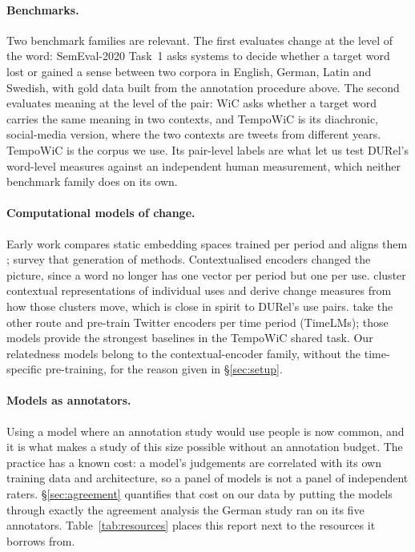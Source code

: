 \documentclass{article}
\begin{document}
\paragraph{Benchmarks.} Two benchmark families are relevant. The first evaluates
change at the level of the word: SemEval-2020 Task~1
\citep{schlechtweg2020semeval} asks systems to decide whether a target word lost
or gained a sense between two corpora in English, German, Latin and Swedish, with
gold data built from the annotation procedure above. The second evaluates
meaning at the level of the pair: WiC \citep{pilehvar2019wic} asks whether a
target word carries the same meaning in two contexts, and TempoWiC
\citep{loureiro2022tempowic} is its diachronic, social-media version, where the
two contexts are tweets from different years. TempoWiC is the corpus we use.
Its pair-level labels are what let us test DURel's word-level measures against
an independent human measurement, which neither benchmark family does on its
own.

\paragraph{Computational models of change.} Early work compares static
embedding spaces trained per period and aligns them
\citep{hamilton2016cultural}; \citet{kutuzov2018survey} survey that generation of
methods. Contextualised encoders changed the picture, since a word no longer has
one vector per period but one per use. \citet{giulianelli2020analysing} cluster
contextual representations of individual uses and derive change measures from
how those clusters move, which is close in spirit to DURel's use pairs.
\citet{loureiro2022timelms} take the other route and pre-train Twitter encoders
per time period (TimeLMs); those models provide the strongest baselines in the
TempoWiC shared task. Our relatedness models belong to the contextual-encoder
family, without the time-specific pre-training, for the reason given in
\S\ref{sec:setup}.

\paragraph{Models as annotators.} Using a model where an annotation study would
use people is now common, and it is what makes a study of this size possible
without an annotation budget. The practice has a known cost: a model's
judgements are correlated with its own training data and architecture, so a
panel of models is not a panel of independent raters.
\S\ref{sec:agreement} quantifies that cost on our data by putting the models
through exactly the agreement analysis the German study ran on its five
annotators. Table~\ref{tab:resources} places this report next to the resources
it borrows from.
\end{document}
